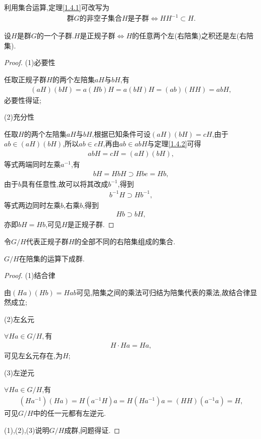 利用集合运算,定理\ref{1.4.1}可改写为\begin{align*}
    \text{群$G$的非空子集合$H$是子群}\iff HH^{-1}\subset H.
\end{align*}
\begin{theorem}
    设$H$是群$G$的一个子群.$H$是正规子群$\iff H$的任意两个左(右陪集)之积还是左(右陪集).
\end{theorem}
\begin{proof}
    (1)必要性

    任取正规子群$H$的两个左陪集$aH$与$bH$,有\begin{align*}
        (aH)(bH)=a(Hb)H=a(bH)H=(ab)(HH)=abH,
    \end{align*}必要性得证;

    (2)充分性

    任取$H$的两个左陪集$aH$与$bH$,根据已知条件可设$(aH)(bH)=cH$,由于$ab\in(aH)(bH)$,所以$ab\in cH$,再由$ab\in abH$与定理\ref{1.4.2}可得\begin{align}
        abH=cH=(aH)(bH),
    \end{align}等式两端同时左乘$a^{-1}$,有\begin{align*}
        bH=HbH\supset Hbe=Hb,
    \end{align*}由于$b$具有任意性,故可以将其改成$b^{-1}$,得到\begin{align*}
        b^{-1}H\supset Hb^{-1},
    \end{align*}等式两边同时左乘$b$,右乘$b$,得到\begin{align*}
        Hb\supset bH,
    \end{align*}亦即$bH=Hb$,可见$H$是正规子群.
\end{proof}
令$G/H$代表正规子群$H$的全部不同的右陪集组成的集合.
\begin{proposition}
    $G/H$在陪集的运算下成群.
\end{proposition}
\begin{proof}
    (1)结合律

    由$(Ha)(Hb)=Hab$可见,陪集之间的乘法可归结为陪集代表的乘法,故结合律显然成立;

    (2)左幺元

    $\forall Ha\in G/H,$有\begin{align*}
        H\cdot Ha=Ha,
    \end{align*}可见左幺元存在,为$H$;

    (3)左逆元

    $\forall Ha\in G/H$,有\begin{align*}
    (Ha^{-1})(Ha)=H(a^{-1}H)a=H(Ha^{-1})a=(HH)(a^{-1}a)=H,
    \end{align*}可见$G/H$中的任一元都有左逆元.

    (1),(2),(3)说明$G/H$成群,问题得证.
\end{proof}

